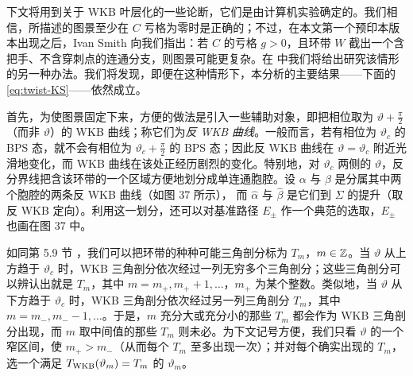 下文将用到关于 WKB 叶层化的一些论断，它们是由计算机实验确定的。我们相信，所描述的图景至少在 $C$ 亏格为零时是正确的；不过，在本文第一个预印本版本出现之后，Ivan Smith 向我们指出：若 $C$ 的亏格 $g>0$，且环带 $W$ 截出一个含把手、不含穿刺点的连通分支，则图景可能更复杂。在 \cite{gmn5-to-appear}%
中我们将给出研究该情形的另一种办法。我们将发现，即便在这种情形下，本分析的主要结果——下面的 \eqref{eq:twist-KS}——依然成立。

首先，为使图景固定下来，方便的做法是引入一些辅助对象，即把相位取为 $\vartheta+\frac{\pi}{2}$（而非 $\vartheta$）的 WKB 曲线；称它们为\emph{反 WKB 曲线}。一般而言，若有相位为 $\vartheta_c$ 的 BPS 态，就不会有相位为 $\vartheta_c+\frac{\pi}{2}$ 的 BPS 态；因此反 WKB 曲线在 $\vartheta=\vartheta_c$ 附近光滑地变化，而 WKB 曲线在该处正经历剧烈的变化。特别地，对 $\vartheta_c$ 两侧的 $\vartheta$，反分界线把含该环带的一个区域方便地划分成单连通胞腔。设 $\alpha$ 与 $\beta$ 是分属其中两个胞腔的两条反 WKB 曲线（如图 37 所示），%
而 $\hat\alpha$ 与 $\hat\beta$ 是它们到 $\Sigma$ 的提升（取反 WKB 定向）。利用这一划分，还可以对基准路径 $E_\pm$ 作一个典范的选取，$E_\pm$ 也画在图 37 中。

如同第 5.9 节%
，我们可以把环带的种种可能三角剖分标为 $T_m$，$m\in\mathbb{Z}$。当 $\vartheta$ 从上方趋于 $\vartheta_c$ 时，WKB 三角剖分依次经过一列无穷多个三角剖分；这些三角剖分可以辨认出就是 $T_m$，其中 $m=m_+,m_++1,\dots$，$m_+$ 为某个整数。类似地，当 $\vartheta$ 从下方趋于 $\vartheta_c$ 时，WKB 三角剖分依次经过另一列三角剖分 $T_m$，其中 $m=m_-,m_--1,\dots$。于是，$m$ 充分大或充分小的那些 $T_m$ 都会作为 WKB 三角剖分出现，而 $m$ 取中间值的那些 $T_m$ 则未必。为下文记号方便，我们只看 $\vartheta$ 的一个窄区间，使 $m_+>m_-$（从而每个 $T_m$ 至多出现一次）；并对每个确实出现的 $T_m$，选一个满足 $T_{\rm WKB}(\vartheta_m)=T_m$ 的 $\vartheta_m$。

